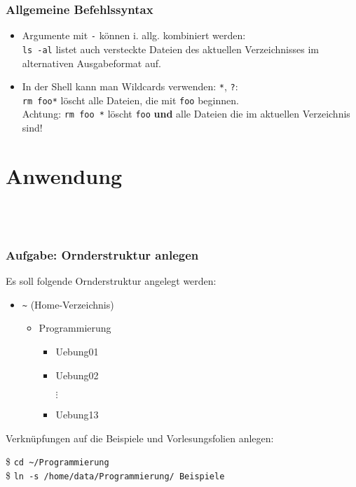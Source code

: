     \begin{frame}
        \frametitle{Allgemeine Befehlssyntax}
        \begin{itemize}
            \item Argumente mit \texttt{-} können i. allg. kombiniert werden: \\
                \texttt{ls -al} listet auch versteckte Dateien des aktuellen
                Verzeichnisses im alternativen Ausgabeformat auf.
            \item In der Shell kann man Wildcards verwenden: \texttt{*}, \texttt{?}: \\
                \texttt{rm foo*} löscht alle Dateien, die mit \texttt{foo}
                beginnen. \\
                \alert{Achtung: }\texttt{rm foo *} löscht \texttt{foo}
                \textbf{und} alle Dateien die im aktuellen Verzeichnis sind!
        \end{itemize}
    \end{frame}

    \section{Anwendung}\subsection{~}

    \begin{frame}
        \frametitle{Aufgabe: Ornderstruktur anlegen}
        Es soll folgende Ornderstruktur angelegt werden:
        \begin{itemize}
            \item \texttt{\textasciitilde} (Home-Verzeichnis)
            \begin{itemize}
                \item Programmierung
                \begin{itemize}
                    \item Uebung01
                    \item Uebung02
                    \item[$\vdots$]
                    \item Uebung13
                \end{itemize}
            \end{itemize}
        \end{itemize}
        \pause
        Verknüpfungen auf die Beispiele und Vorlesungsfolien anlegen:
        \begin{tryit}
            \$ \texttt{cd \textasciitilde/Programmierung} \\
            \$ \texttt{ln -s /home/data/Programmierung/ Beispiele}
        \end{tryit}
    \end{frame}

